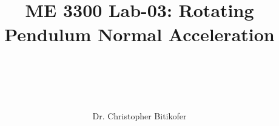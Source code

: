 
\title{
\begin{center}
\HRule \\[0.4cm]
{\Huge \bfseries ME 3300 Lab-03: 
Rotating Pendulum Normal Acceleration \\[0.5cm] 
}\\[0.4cm] %
\HRule \\[1.5cm]
\end{center}
}
\author{\Large Dr. Christopher Bitikofer \\ \\ \\[.1cm]} %
\date{} %

\maketitle
\tableofcontents